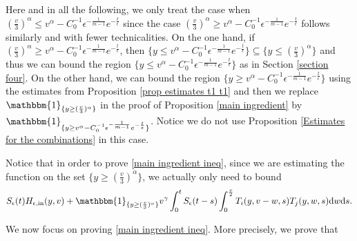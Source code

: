 \documentclass[11pt]{article}
\numberwithin{equation}{section}
\newcommand{\der}{\textup{d}}
\begin{document}
  
 
  
 


\begin{rmk}
Here and in all the following, we only treat the case when $(\frac{v}{3})^{\alpha} \leq v^{\alpha}-C_{0}^{-1}\epsilon^{-\frac{1}{m-1}}  e^{-\frac{t}{\epsilon}}$ since the case $(\frac{v}{3})^{\alpha} \geq v^{\alpha}-C_{0}^{-1}\epsilon^{-\frac{1}{m-1}}  e^{-\frac{t}{\epsilon}}$ follows similarly and with fewer technicalities. On the one hand, if $(\frac{v}{3})^{\alpha} \geq v^{\alpha}-C_{0}^{-1}\epsilon^{-\frac{1}{m-1}}  e^{-\frac{t}{\epsilon}}$, then $\{y\leq  v^{\alpha}-C_{0}^{-1}\epsilon^{-\frac{1}{m-1}}  e^{-\frac{t}{\epsilon}}\}\subseteq \{y\leq(\frac{v}{3})^{\alpha}\}$ and thus we can bound the region $\{y\leq  v^{\alpha}-C_{0}^{-1}\epsilon^{-\frac{1}{m-1}}  e^{-\frac{t}{\epsilon}}\}$ as in Section \ref{section four}. On the other hand, we can bound the region $\{y\geq   v^{\alpha}-C_{0}^{-1}\epsilon^{-\frac{1}{m-1}}  e^{-\frac{t}{\epsilon}}\}$ using the estimates from Proposition \ref{prop estimates t1 t1} and then we replace $\mathbbm{1}_{\{y\geq (\frac{v}{3})^{\alpha}\}}$ in the proof of Proposition \ref{main ingredient} by  $\mathbbm{1}_{\{y\geq v^{\alpha}-C_{0}^{-1}\epsilon^{-\frac{1}{m-1}}  e^{-\frac{t}{\epsilon}}\}}$. Notice we do not use Proposition \ref{Estimates for the combinations} in this case.
\end{rmk}
\begin{rmk}\label{remark region}
Notice that in order to prove \eqref{main ingredient ineq}, since we are estimating the function on the set $\{y\geq (\frac{v}{3})^{\alpha}\}$, we actually only need to bound
\begin{align*}
     S_{\epsilon}(t)H_{\epsilon,\textup{in}}(y,v)+ \mathbbm{1}_{\{y\geq (\frac{v}{3})^{\alpha}\}} v^{\gamma}\int_{0}^{t}S_{\epsilon}(t-s)\int_{0}^{\frac{v}{2}} T_{i}(y,v-w,s)T_{j}(y,w,s)\der w\der s.
\end{align*}
\end{rmk}


We now focus on proving \eqref{main ingredient ineq}. More precisely, we prove that
\end{document}
